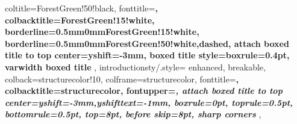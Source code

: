 {{                           coltitle=ForestGreen!50!black,
						   fonttitle=\bfseries,
						   colbacktitle=ForestGreen!15!white,
                           borderline={0.5mm}{0mm}{ForestGreen!15!white},
                           borderline={0.5mm}{0mm}{ForestGreen!50!white,dashed},
                           attach boxed title to top center={yshift=-3mm},
                           boxed title style={boxrule=0.4pt},
						   varwidth boxed title
						   },
        introductionsty/.style={
                           enhanced,
                           breakable,
                           colback=structurecolor!10,
                           colframe=structurecolor,
                           fonttitle=\bfseries,
                           colbacktitle=structurecolor,
                           fontupper=\itshape,
                           attach boxed title to top center={yshift=-3mm,yshifttext=-1mm},
                           boxrule=0pt,
                           toprule=0.5pt,
                           bottomrule=0.5pt,
                           top=8pt,
                           before skip=8pt,
                           sharp corners
                         },
    }

